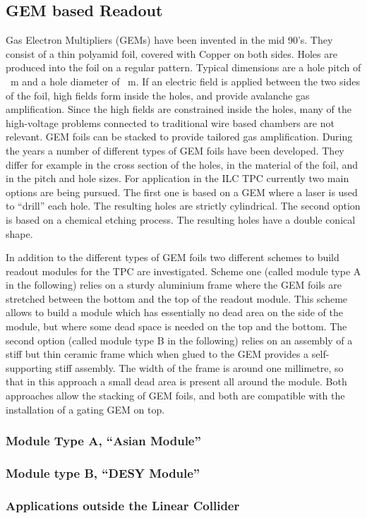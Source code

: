 \subsection{GEM based Readout}\label{chap:TPC_sec:standard_gems}

Gas Electron Multipliers (GEMs) \cite{Sauli_GEM} have been invented in the mid 90's. They consist of a thin polyamid foil, covered with Copper on both sides. Holes are produced into the foil on a regular pattern. Typical dimensions are a hole pitch of \unit[140]{\mu m} and a hole diameter of \unit[70]{\mu m}. If an electric field is applied between the two sides of the foil, high fields form inside the holes, and provide avalanche gas amplification. Since the high fields are constrained inside the holes, many of the high-voltage problems connected to traditional wire based chambers are not relevant. GEM foils can be stacked to provide tailored gas amplification. During the years a number of different types of GEM foils have been developed. They differ for example in the cross section of the holes, in the material of the foil, and in the pitch and hole sizes. For application in the ILC TPC currently two main options are being pursued. The first one is based on a GEM where a laser is used to ``drill'' each hole.
The resulting holes are
strictly cylindrical. The second option is based on a chemical etching process. The resulting holes have a double conical shape.

In addition to the different types of GEM foils two different schemes to build readout modules for the TPC are investigated. Scheme one (called module type A in the following) relies on a sturdy aluminium frame where the GEM foils are stretched between the bottom and the top of the readout module. This scheme allows to build a module which has essentially no dead area on the side of the module, but where some dead space is needed on the top and the bottom. The second option (called module type B in the following) relies on an assembly of a stiff but thin ceramic frame which when glued to the GEM provides a self-supporting stiff assembly. The width of the frame is around one millimetre, so that in this approach a small dead area is present all around the module. Both approaches allow the stacking of GEM foils, and both are compatible with the installation of a gating GEM on top.

\subsubsection{Module Type A, ``Asian Module''}

\subsubsection{Module type B, ``DESY Module''}

\subsubsection{Applications outside the Linear Collider}
